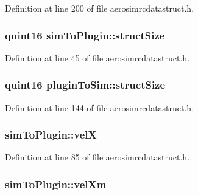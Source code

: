 Definition at line 200 of file aerosimrcdatastruct.\-h.

\hypertarget{group___aero_sim_r_c_gab277fde5232c4a8c41adcdcc1dc7199f}{
\subsubsection[{struct\-Size}]{\setlength{\rightskip}{0pt plus 5cm}quint16 sim\-To\-Plugin\-::struct\-Size}}\label{group___aero_sim_r_c_gab277fde5232c4a8c41adcdcc1dc7199f}


Definition at line 45 of file aerosimrcdatastruct.\-h.

\hypertarget{group___aero_sim_r_c_ga785b39329b27020e1525b4999a10d230}{
\subsubsection[{struct\-Size}]{\setlength{\rightskip}{0pt plus 5cm}quint16 plugin\-To\-Sim\-::struct\-Size}}\label{group___aero_sim_r_c_ga785b39329b27020e1525b4999a10d230}


Definition at line 144 of file aerosimrcdatastruct.\-h.

\hypertarget{group___aero_sim_r_c_gad7b2d0364e0e774256fc64c187a8c336}{
\subsubsection[{vel\-X}]{ sim\-To\-Plugin\-::vel\-X}}\label{group___aero_sim_r_c_gad7b2d0364e0e774256fc64c187a8c336}


Definition at line 85 of file aerosimrcdatastruct.\-h.

\hypertarget{group___aero_sim_r_c_ga5b8ca52e6b6fcba33660c4164ff14b21}{
\subsubsection[{vel\-Xm}]{ sim\-To\-Plugin\-::vel\-Xm}}\label{group___aero_sim_r_c_ga5b8ca52e6b6fcba33660c4164ff14b21}


